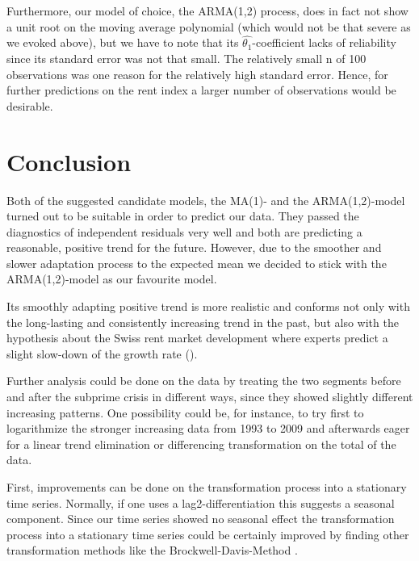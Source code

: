 \documentclass[11pt,a4paper]{article}
\begin{document}
Furthermore, our model of choice, the ARMA(1,2) process, does in fact not show a unit root on the moving average polynomial (which would not be that severe as we evoked above), but we have to note that its $\hat{\theta_1}$-coefficient lacks of reliability since its standard error was not that small. The relatively small n of 100 observations was one reason for the relatively high standard error. Hence, for further predictions on the rent index a larger number of observations would be desirable.



\section{Conclusion}

Both of the suggested candidate models, the MA(1)- and the ARMA(1,2)-model turned out to be suitable in order to predict our data. They passed the diagnostics of independent residuals very well and both are predicting a reasonable, positive trend for the future. However, due to the smoother and slower adaptation process to the expected mean we decided to stick with the ARMA(1,2)-model as our favourite model.

Its smoothly adapting positive trend is more realistic and conforms not only with the long-lasting and consistently increasing trend in the past, but also with the hypothesis about the Swiss rent market development where experts predict a slight slow-down of the growth rate (\cite[p.~4]{cs}). 

Further analysis could be done on the data by treating the two segments before and after the subprime crisis in different ways, since they showed slightly different increasing patterns. One possibility could be, for instance, to try first to logarithmize the stronger increasing data from 1993 to 2009 and afterwards eager for a linear trend elimination or differencing transformation on the total of the data.  

First, improvements can be done on the transformation process into a stationary time series. Normally, if one uses a lag2-differentiation this suggests  a seasonal component. Since our time series showed no seasonal effect the transformation process into a stationary time series could be certainly improved by finding other transformation methods like the Brockwell-Davis-Method \citep{bd02}. 
\end{document}
